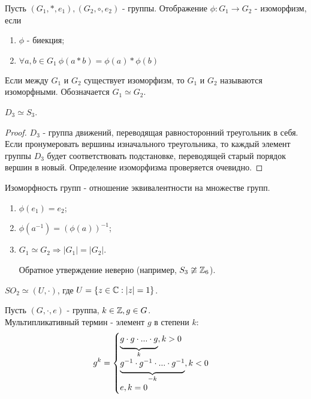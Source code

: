\begin{definition}
    Пусть $(G_1, *, e_1), (G_2, \circ ,e_2)$ - группы. Отображение $\phi: G_1 \rightarrow G_2$ - изоморфизм, если
    \begin{enumerate}
        \item $\phi$ - биекция;
        \item $\forall a, b \in G_1 \ \phi(a * b) = \phi(a) * \phi(b)$
    \end{enumerate}
    Если между $G_1$ и $G_2$ существует изоморфизм, то $G_1$ и $G_2$ называются изоморфными. Обозначается $G_1 \simeq  G_2$.
\end{definition}
\begin{example}
    $D_3 \simeq S_3$.
\end{example}
\begin{proof}
    $D_3$ - группа движений, переводящая равносторонний треугольник в себя. Если пронумеровать вершины изначального треугольника, то каждый элемент группы $D_3$ будет соответствовать подстановке, переводящей старый порядок вершин в новый. Определение изоморфизма проверяется очевидно.
\end{proof}
\begin{subtheorem}
    Изоморфность групп - отношение эквивалентности на множестве групп.
\end{subtheorem}
\begin{subtheorem} \tab
    \begin{enumerate}
        \item $\phi(e_1) = e_2$;
        \item $\phi(a^{-1}) = (\phi(a))^{-1}$;
        \item $G_1 \simeq  G_2 \Longrightarrow |G_1| = |G_2|$.
        \begin{remark}
            Обратное утверждение неверно (например, $S_3 \ncong \mathbb{Z}_6$).
        \end{remark}
    \end{enumerate}
\end{subtheorem}
\begin{example}
    $SO_2 \simeq (U, \cdot)$, где $U = \{z \in \mathbb{C} : |z| = 1\}$.
\end{example}
\begin{definition}
    Пусть $(G, \cdot, e)$ - группа, $k \in \mathbb{Z}, g \in G$.\\
    Мультипликативный термин - элемент $g$ в степени $k$:
    $$g^k =
    \begin{cases} \undermat{k}{g \cdot g \cdot ... \cdot g}, k > 0 \\
        \\
        \undermat{-k}{g^{-1} \cdot g^{-1} \cdot ... \cdot g^{-1}}, k < 0 \\
        \\
        e, k = 0
    \end{cases}$$
\end{definition}
